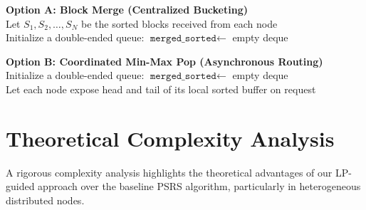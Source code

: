 \documentclass[]{interact}
\theoremstyle{plain}
\theoremstyle{definition}
\theoremstyle{remark}
\begin{document}
\begin{algorithm}[H]
\textbf{Option A: Block Merge (Centralized Bucketing)} \\
Let $S_1, S_2, \ldots, S_N$ be the sorted blocks received from each node \\
Initialize a double-ended queue: $\texttt{merged\_sorted} \leftarrow$ empty deque \\



\vspace{2mm}

\textbf{Option B: Coordinated Min-Max Pop (Asynchronous Routing)} \\
Initialize a double-ended queue: $\texttt{merged\_sorted} \leftarrow$ empty deque \\
Let each node expose head and tail of its local sorted buffer on request \\



\end{algorithm}
    






\section{Theoretical Complexity Analysis}

A rigorous complexity analysis highlights the theoretical advantages of our LP-guided approach over the baseline PSRS algorithm, particularly in heterogeneous distributed nodes.

\end{document}
